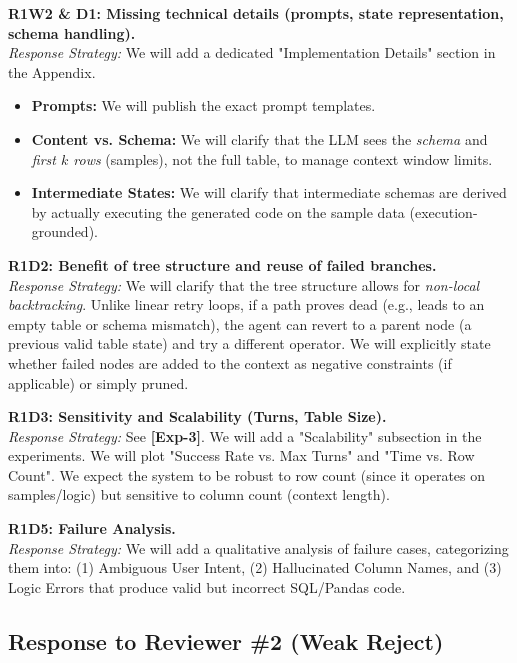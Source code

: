 \noindent \textbf{R1W2 \& D1: Missing technical details (prompts, state representation, schema handling).} \\
\textit{Response Strategy:} We will add a dedicated "Implementation Details" section in the Appendix.
\begin{itemize}
    \item \textbf{Prompts:} We will publish the exact prompt templates.
    \item \textbf{Content vs. Schema:} We will clarify that the LLM sees the \textit{schema} and \textit{first $k$ rows} (samples), not the full table, to manage context window limits.
    \item \textbf{Intermediate States:} We will clarify that intermediate schemas are derived by actually executing the generated code on the sample data (execution-grounded).
\end{itemize}

\noindent \textbf{R1D2: Benefit of tree structure and reuse of failed branches.} \\
\textit{Response Strategy:} We will clarify that the tree structure allows for \textit{non-local backtracking}. Unlike linear retry loops, if a path proves dead (e.g., leads to an empty table or schema mismatch), the agent can revert to a parent node (a previous valid table state) and try a different operator. We will explicitly state whether failed nodes are added to the context as negative constraints (if applicable) or simply pruned.

\noindent \textbf{R1D3: Sensitivity and Scalability (Turns, Table Size).} \\
\textit{Response Strategy:} See \textbf{[Exp-3]}. We will add a "Scalability" subsection in the experiments. We will plot "Success Rate vs. Max Turns" and "Time vs. Row Count". We expect the system to be robust to row count (since it operates on samples/logic) but sensitive to column count (context length).

\noindent \textbf{R1D5: Failure Analysis.} \\
\textit{Response Strategy:} We will add a qualitative analysis of failure cases, categorizing them into: (1) Ambiguous User Intent, (2) Hallucinated Column Names, and (3) Logic Errors that produce valid but incorrect SQL/Pandas code.

\subsection*{Response to Reviewer \#2 (Weak Reject)}

